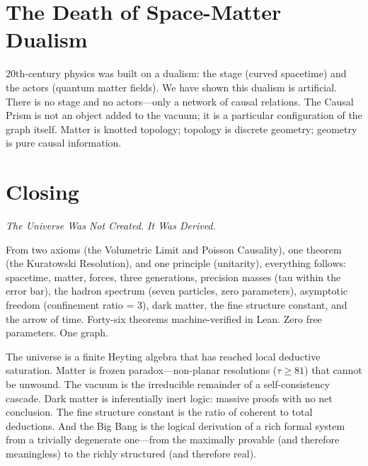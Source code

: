 \documentclass[11pt, a4paper, openany]{book}
\begin{document}
\section{The Death of Space-Matter Dualism}\label{sec:dualism}

20th-century physics was built on a dualism: the stage (curved spacetime) and the actors (quantum matter fields). We have shown this dualism is artificial. There is no stage and no actors---only a network of causal relations. The Causal Prism is not an object added to the vacuum; it is a particular configuration of the graph itself. Matter is knotted topology; topology is discrete geometry; geometry is pure causal information.

\section*{Closing}

\vspace{1cm}
\begin{center}
\itshape
The Universe Was Not Created. It Was Derived.

\medskip
From two axioms (the Volumetric Limit and Poisson Causality), one theorem (the Kuratowski Resolution), and one principle (unitarity), everything follows: spacetime, matter, forces, three generations, precision masses (tau within the error bar), the hadron spectrum (seven particles, zero parameters), asymptotic freedom (confinement ratio = 3), dark matter, the fine structure constant, and the arrow of time.  Forty-six theorems machine-verified in Lean.  Zero free parameters.  One graph.
\end{center}

\begin{logicalreading}
The universe is a finite Heyting algebra that has reached local deductive saturation. Matter is frozen paradox---non-planar resolutions ($\tau \geq 81$) that cannot be unwound. The vacuum is the irreducible remainder of a self-consistency cascade. Dark matter is inferentially inert logic: massive proofs with no net conclusion. The fine structure constant is the ratio of coherent to total deductions. And the Big Bang is the logical derivation of a rich formal system from a trivially degenerate one---from the maximally provable (and therefore meaningless) to the richly structured (and therefore real).
\end{logicalreading}
\end{document}

